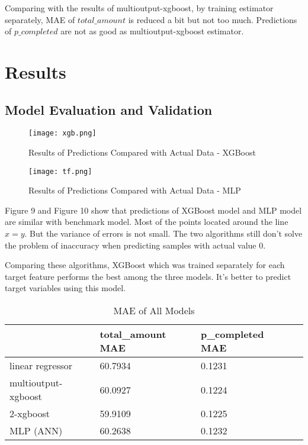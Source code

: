 \documentclass[a4paper,12pt]{article}
\begin{document}
Comparing with the results of multioutput-xgboost, by training estimator separately, MAE of $total\_amount$ is reduced a bit but 
not too much. Predictions of $p\_completed$ are not as good as multioutput-xgboost estimator.

\section{Results}

\subsection*{Model Evaluation and Validation}

\begin{figure}[H]
    \centering
    \texttt{[image: xgb.png]} 
    \caption{Results of Predictions Compared with Actual Data - XGBoost}
\end{figure}

\begin{figure}[H]
    \centering
    \texttt{[image: tf.png]} 
    \caption{Results of Predictions Compared with Actual Data - MLP}
\end{figure}

Figure 9 and Figure 10 show that predictions of XGBoost model and MLP model are similar with benchmark model. Most of the points 
located around the line $x = y$. But the variance of errors is not small. The two algorithms still don't solve the problem of 
inaccuracy when predicting samples with actual value 0.

Comparing these algorithms, XGBoost which was trained separately for each target feature performs the best among the three 
models. It's better to predict target variables using this model.

\begin{table}[H]
    \centering
    \begin{tabular}{|l|l|l|l|}
    \hline
                        & total\_amount MAE & p\_completed  MAE \\
    \hline
    linear regressor    & 60.7934           & 0.1231 \\
    \hline
    multioutput-xgboost & 60.0927           & 0.1224 \\
    \hline
    2-xgboost           & 59.9109           & 0.1225 \\
    \hline
    MLP (ANN)           & 60.2638           & 0.1232 \\
    \hline
    \end{tabular}
    \caption{MAE of All Models}
\end{table}
\end{document}
